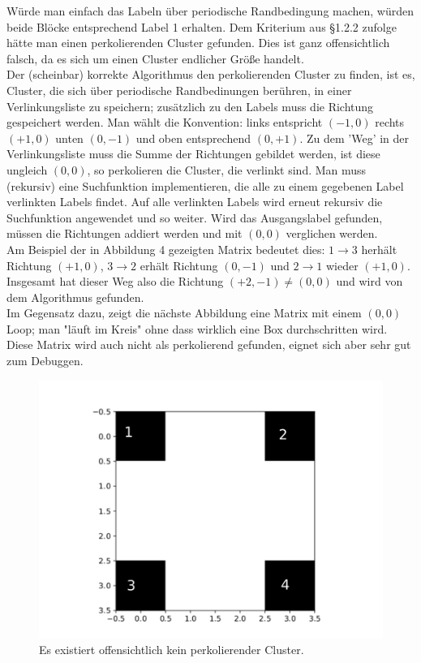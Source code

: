\documentclass[a4paper, 12pt]{report}
\begin{document}
\vspace{0.5cm}
\noindent Würde man einfach das Labeln über periodische Randbedingung machen, würden beide Blöcke entsprechend Label 1 erhalten. Dem Kriterium aus §1.2.2 zufolge hätte man einen perkolierenden Cluster gefunden. Dies ist ganz offensichtlich falsch, da es sich um einen Cluster endlicher Größe handelt.
\\
\noindent Der (scheinbar) korrekte Algorithmus den perkolierenden Cluster zu finden, ist es, Cluster, die sich über periodische Randbedinungen berühren, in einer Verlinkungsliste zu speichern; zusätzlich zu den Labels muss die Richtung gespeichert werden. Man wählt die Konvention: links entspricht $(-1,0)$ rechts $(+1,0)$ unten $(0,-1)$ und oben entsprechend $(0,+1)$. Zu dem 'Weg' in der Verlinkungsliste muss die Summe der Richtungen gebildet werden, ist diese ungleich $(0,0)$, so perkolieren die Cluster, die verlinkt sind. Man muss (rekursiv) eine Suchfunktion implementieren, die alle zu einem gegebenen Label verlinkten Labels findet. Auf alle verlinkten Labels wird erneut rekursiv die Suchfunktion angewendet und so weiter. Wird das Ausgangslabel gefunden, müssen die Richtungen addiert werden und mit $(0,0)$ verglichen werden.
\\
\noindent Am Beispiel der in Abbildung 4 gezeigten Matrix bedeutet dies: $1 \rightarrow 3$ herhält Richtung $(+1,0)$, $3 \rightarrow 2$ erhält Richtung $(0,-1)$ und $2 \rightarrow 1$ wieder $(+1,0)$. Insgesamt hat dieser Weg also die Richtung $(+2,-1) \neq (0,0)$ und wird von dem Algorithmus gefunden.
\\
\noindent Im Gegensatz dazu, zeigt die nächste Abbildung eine Matrix mit einem $(0,0)$ Loop; man "läuft im Kreis" ohne dass wirklich eine Box durchschritten wird. Diese Matrix wird auch nicht als perkolierend gefunden, eignet sich aber sehr gut zum Debuggen.

\begin{figure}[H]
	\centering
	\includegraphics[scale=0.6]{noperc2.pdf}
	\caption{Es existiert offensichtlich kein perkolierender Cluster.}
\end{figure}
\end{document}
